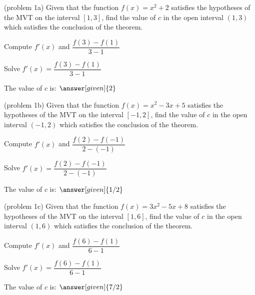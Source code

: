 \documentclass{ximera}
\begin{document}
\begin{problem}(problem 1a)
  Given that the function $f(x) = x^2 + 2$ satisfies the hypotheses of the MVT on the
	interval $[1,3]$, find the value of $c$ in the open interval $(1,3)$ which satisfies 
	the conclusion of the theorem.
	
    \begin{hint}
      Compute $f'(x)$ and $\dfrac{f(3) - f(1)}{3-1}$
    \end{hint}
		\begin{hint}
		  Solve $f'(x) = \dfrac{f(3) - f(1)}{3-1}$
		\end{hint}
		
		The value of $c$ is:
		 $\answer[given]{2}$
\end{problem}

\begin{problem}(problem 1b)
  Given that the function $f(x) = x^2 -3x + 5$ satisfies the hypotheses of the MVT on the
	interval $[-1,2]$, find the value of $c$ in the open interval $(-1,2)$ which satisfies 
	the conclusion of the theorem.
	
    \begin{hint}
      Compute $f'(x)$ and $\dfrac{f(2) - f(-1)}{2-(-1)}$
    \end{hint}
		\begin{hint}
		  Solve $f'(x) = \dfrac{f(2) - f(-1)}{2-(-1)}$
		\end{hint}
		
		The value of $c$ is:
		 $\answer[given]{1/2}$
\end{problem}

\begin{problem}(problem 1c)
  Given that the function $f(x) = 3x^2 -5x + 8$ satisfies the hypotheses of the MVT on the
	interval $[1,6]$, find the value of $c$ in the open interval $(1,6)$ which satisfies 
	the conclusion of the theorem.
	
    \begin{hint}
      Compute $f'(x)$ and $\dfrac{f(6) - f(1)}{6-1}$
    \end{hint}
		\begin{hint}
		  Solve $f'(x) = \dfrac{f(6) - f(1)}{6-1}$
		\end{hint}
		
		The value of $c$ is:
		 $\answer[given]{7/2}$
\end{problem}
\end{document}
